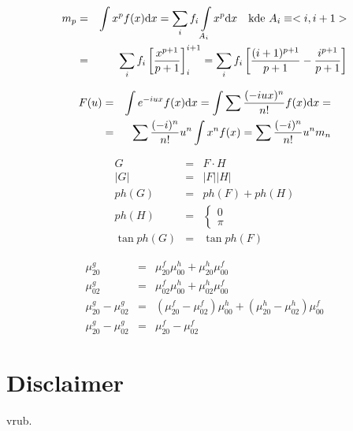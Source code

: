 \begin{eqnarray}
m_p&=&\int x^p f(x){\rm d} x=\sum\limits_{i}f_i\int\limits_{A_i}x^p{\rm d} x\quad\hbox{kde $A_i\equiv<i,i+1>$}\\
&=&\sum\limits_{i}f_i\left[\frac{x^{p+1}}{p+1}\right]^{i+1}_i=\sum\limits_{i}f_i
\left[\frac{(i+1)^{p+1}}{p+1}-\frac{i^{p+1}}{p+1}\right]
\end{eqnarray}


\begin{itemize}
\end{itemize}


\begin{eqnarray}
F(u)&=&\int e^{-iux}f(x){\rm d} x=\int\sum\frac{(-iux)^n}{n!}f(x){\rm d} x=\nonumber\\
&=&\sum\frac{(-i)^n}{n!}u^n\int x^nf(x)=\sum\frac{(-i)^n}{n!}u^n m_n\label{rada}
\end{eqnarray}




\begin{eqnarray}
G&=&F\cdot H\\
|G|&=&|F||H|\\
ph(G)&=&ph(F)+ph(H)\\
ph(H)&=&\left\{\begin{array}{ll}0\\\pi\end{array}\right.\\
\tan ph(G)&=&\tan ph(F)
\end{eqnarray}

\begin{eqnarray}
\mu_{20}^g&=&\mu_{20}^f\mu_{00}^h+\mu_{20}^h\mu_{00}^f\\
\mu_{02}^g&=&\mu_{02}^f\mu_{00}^h+\mu_{02}^h\mu_{00}^f\\
\mu_{20}^g-\mu_{02}^g&=&(\mu_{20}^f-\mu_{02}^f)\mu_{00}^h+(\mu_{20}^h-\mu_{02}^h)\mu_{00}^f\\
\mu_{20}^g-\mu_{02}^g&=&\mu_{20}^f-\mu_{02}^f
\end{eqnarray}

\section*{Disclaimer}
{
\sc
vrub.

}

